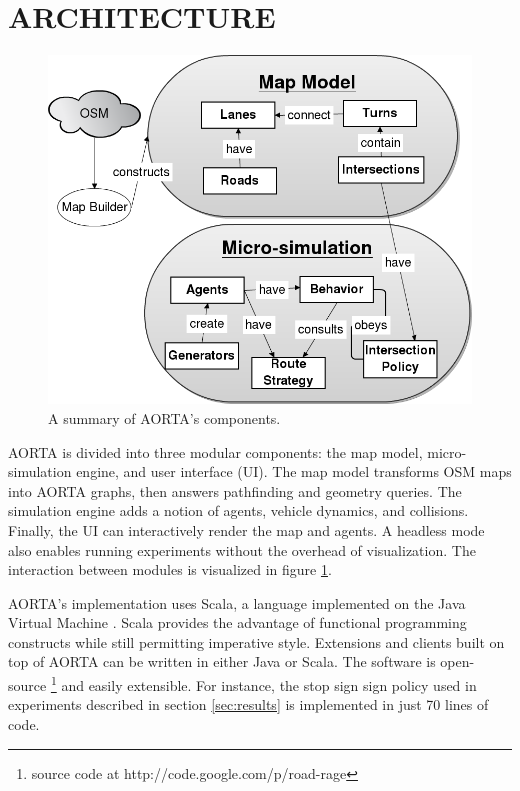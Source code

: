\documentclass[letterpaper, 10 pt, conference]{ieeeconf}  %
\begin{document}


\section{ARCHITECTURE}
\label{sec:arch}

\begin{figure}
  \centering \includegraphics[scale=0.3]{architecture.png}
  \caption{A summary of AORTA's components.}
  \label{fig:arch}
  \vspace{-20pt}
\end{figure}

AORTA is divided into three modular components: the map model, micro-simulation
engine, and user interface (UI). The map model transforms OSM maps into AORTA
graphs, then answers pathfinding and geometry queries. The simulation engine
adds a notion of agents, vehicle dynamics, and collisions. Finally, the UI can
interactively render the map and agents. A headless mode also enables running
experiments without the overhead of visualization. The interaction between
modules is visualized in figure \ref{fig:arch}.

AORTA's implementation uses Scala, a language implemented on the Java Virtual
Machine \cite{scala}. Scala provides the advantage of functional programming
constructs while still permitting imperative style.  Extensions and clients
built on top of AORTA can be written in either Java or Scala. The software is
open-source \footnote{source code at http://code.google.com/p/road-rage} and
easily extensible. For instance, the stop sign sign policy used in experiments
described in section \ref{sec:results} is implemented in just 70 lines of code.
\end{document}
